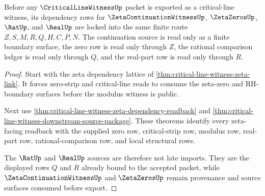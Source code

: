 \begin{theorem}
\label{thm:critical-line-witness-zeta-dependency-lock}
Before any $\CriticalLineWitnessUp$ packet is exported as a critical-line witness, its dependency rows for $\ZetaContinuationWitnessUp$, $\ZetaZerosUp$, $\RatUp$, and $\RealUp$ are locked into the same finite route $Z,S,M,R,Q,H,C,P,N$. The continuation source is read only as a finite boundary surface, the zero row is read only through $Z$, the rational comparison ledger is read only through $Q$, and the real-part row is read only through $R$.
\end{theorem}
\begin{proof}
Start with the zeta dependency lattice of \autoref{thm:critical-line-witness-zeta-link}. It forces zero-strip and critical-line reads to consume the zeta-zero and RH-boundary surfaces before the modulus witness is public.

Next use \autoref{thm:critical-line-witness-zeta-dependency-readback} and \autoref{thm:critical-line-witness-downstream-source-package}. These theorems identify every zeta-facing readback with the supplied zero row, critical-strip row, modulus row, real-part row, rational-comparison row, and local structural rows.

The $\RatUp$ and $\RealUp$ sources are therefore not late imports. They are the displayed rows $Q$ and $R$ already bound to the accepted packet, while $\ZetaContinuationWitnessUp$ and $\ZetaZerosUp$ remain provenance and source surfaces consumed before export.
\end{proof}

